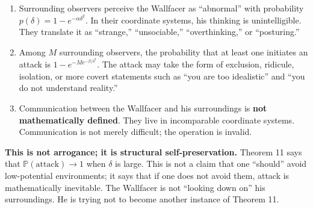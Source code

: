\documentclass[12pt,a4paper]{article}
\theoremstyle{remark}
\newcommand{\Pbb}{\mathbb{P}}
\begin{document}
\begin{enumerate}[label=(\roman*)]
    \item Surrounding observers perceive the Wallfacer as ``abnormal'' with probability $p(\delta) = 1 - e^{-\alpha\delta^2}$. In their coordinate systems, his thinking is unintelligible. They translate it as ``strange,'' ``unsociable,'' ``overthinking,'' or ``posturing.''
    \item Among $M$ surrounding observers, the probability that at least one initiates an attack is $1 - e^{-M e^{-\beta/\delta^2}}$. The attack may take the form of exclusion, ridicule, isolation, or more covert statements such as ``you are too idealistic'' and ``you do not understand reality.''
    \item Communication between the Wallfacer and his surroundings is \textbf{not mathematically defined}. They live in incomparable coordinate systems. Communication is not merely difficult; the operation is invalid.
\end{enumerate}

\textbf{This is not arrogance; it is structural self-preservation.} Theorem 11 says that $\Pbb(\text{attack}) \to 1$ when $\delta$ is large. This is not a claim that one ``should'' avoid low-potential environments; it says that if one does not avoid them, attack is mathematically inevitable. The Wallfacer is not ``looking down on'' his surroundings. He is trying not to become another instance of Theorem 11.
\end{document}
